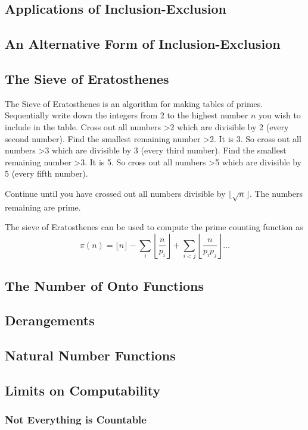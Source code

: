   \subsection{Applications of Inclusion-Exclusion}
  \subsection{An Alternative Form of Inclusion-Exclusion}
  \subsection{The Sieve of Eratosthenes}
  The Sieve of Eratosthenes is an algorithm for making tables of primes. Sequentially write down the integers from 2 to the highest number $n$ you wish to include in the table. Cross out all numbers >2 which are divisible by 2 (every second number). Find the smallest remaining number >2. It is 3. So cross out all numbers >3 which are divisible by 3 (every third number). Find the smallest remaining number >3. It is 5. So cross out all numbers >5 which are divisible by 5 (every fifth number).

Continue until you have crossed out all numbers divisible by $\lfloor\sqrt{n}\rfloor$. The numbers remaining are prime. 

The sieve of Eratosthenes can be used to compute the prime counting function as
$$\pi(n) = \lfloor n \rfloor- \sum_i\left\lfloor \frac{n}{p_i} \right\rfloor + \sum_{i<j} \left\lfloor{ \frac{n}{p_ip_j}}\right\rfloor \dots$$
  \subsection{The Number of Onto Functions}
  \subsection{Derangements}


    \subsection {Natural Number Functions}
    \subsection {Limits on Computability}
        \subsubsection {Not Everything is Countable}

